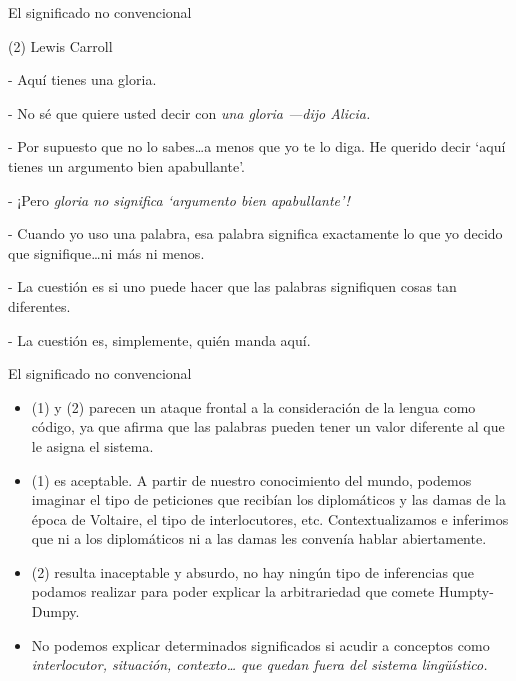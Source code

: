 \documentclass{beamer}
\begin{document}
\begin{frame}{El significado no convencional}

(2) Lewis Carroll

\vspace{0.5cm}

- Aquí tienes una gloria. 

- No sé que quiere usted decir con \it{una gloria} ---dijo Alicia.

- Por supuesto que no lo sabes\ldots a menos que yo te lo diga. He querido decir `aquí tienes un argumento bien apabullante'.

- ¡Pero \it{gloria} no significa `argumento bien apabullante'!

- Cuando yo uso una palabra, esa palabra significa exactamente lo que yo decido que signifique\ldots ni más ni menos. 

- La cuestión es si uno puede hacer que las palabras signifiquen cosas tan diferentes.

- La cuestión es, simplemente, quién manda aquí. 

\end{frame}

\begin{frame}{El significado no convencional}

\begin{itemize}
	\item (1) y (2) parecen un ataque frontal a la consideración de la lengua como código, ya que afirma que las palabras pueden tener un valor diferente al que le asigna el sistema.
	\item (1) es aceptable. A partir de nuestro conocimiento del mundo, podemos imaginar el tipo de peticiones que recibían los diplomáticos y las damas de la época de Voltaire, el tipo de interlocutores, etc. Contextualizamos e inferimos que ni a los diplomáticos ni a las damas les convenía hablar abiertamente.
	\item (2) resulta inaceptable y absurdo, no hay ningún tipo de inferencias que podamos realizar para poder explicar la arbitrariedad que comete Humpty-Dumpy. 
		\item No podemos explicar determinados significados si acudir a conceptos como \it{interlocutor, situación, contexto\ldots} que quedan fuera del sistema lingüístico.
\end{itemize}

\end{frame}
\end{document}
